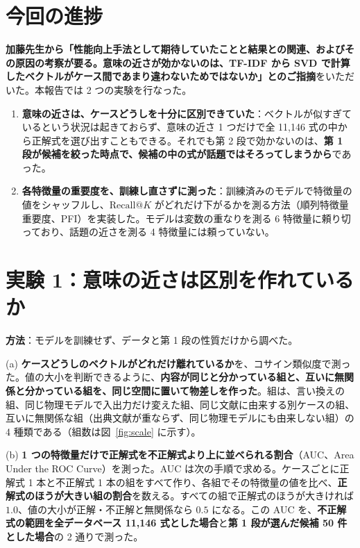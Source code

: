 \documentclass[11pt,a4paper]{ltjsarticle}
\makeatletter
\newcommand{\rk}{\textrm{Recall@}K}
\makeatother
\begin{document}
\section{今回の進捗}
\textbf{加藤先生から「性能向上手法として期待していたことと結果との関連、およびその原因の考察が要る。意味の近さが効かないのは、TF-IDF から SVD で計算したベクトルがケース間であまり違わないためではないか」とのご指摘}をいただいた。本報告では 2 つの実験を行なった。

\begin{enumerate}[leftmargin=1.8em]
  \item \textbf{意味の近さは、ケースどうしを十分に区別できていた}：ベクトルが似すぎているという状況は起きておらず、意味の近さ 1 つだけで全 11{,}146 式の中から正解式を選び出すこともできる。それでも第 2 段で効かないのは、\textbf{第 1 段が候補を絞った時点で、候補の中の式が話題ではそろってしまうから}であった。
  \item \textbf{各特徴量の重要度を、訓練し直さずに測った}：訓練済みのモデルで特徴量の値をシャッフルし、$\rk$ がどれだけ下がるかを測る方法（順列特徴量重要度、PFI）を実装した。モデルは変数の重なりを測る 6 特徴量に頼り切っており、話題の近さを測る 4 特徴量には頼っていない。
\end{enumerate}

\section{実験 1：意味の近さは区別を作れているか}\label{sec:exp1}
\textbf{方法}：モデルを訓練せず、データと第 1 段の性質だけから調べた。

(a) \textbf{ケースどうしのベクトルがどれだけ離れているか}を、コサイン類似度で測った。値の大小を判断できるように、\textbf{内容が同じと分かっている組と、互いに無関係と分かっている組を、同じ空間に置いて物差しを作った}。組は、言い換えの組、同じ物理モデルで入出力だけ変えた組、同じ文献に由来する別ケースの組、互いに無関係な組（出典文献が重ならず、同じ物理モデルにも由来しない組）の 4 種類である（組数は図~\ref{fig:scale} に示す）。

(b) \textbf{1 つの特徴量だけで正解式を不正解式より上に並べられる割合}（AUC、Area Under the ROC Curve）を測った。AUC は次の手順で求める。ケースごとに正解式 1 本と不正解式 1 本の組をすべて作り、各組でその特徴量の値を比べ、\textbf{正解式のほうが大きい組の割合}を数える。すべての組で正解式のほうが大きければ $1.0$、値の大小が正解・不正解と無関係なら $0.5$ になる。この AUC を、\textbf{不正解式の範囲を全データベース 11{,}146 式とした場合}と\textbf{第 1 段が選んだ候補 50 件とした場合}の 2 通りで測った。
\end{document}
